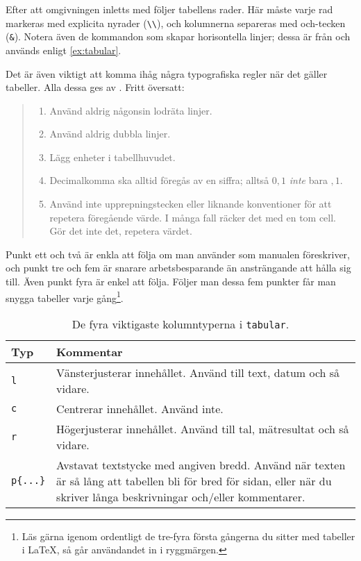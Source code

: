 \documentclass[10pt,../../a4.tex]{subfiles}
\begin{document}
Efter att omgivningen inletts med  följer tabellens rader. Här
måste varje rad markeras med explicita nyrader (\verb|\\|), och kolumnerna
separeras med och-tecken (\verb|&|). Notera även de kommandon som skapar
horisontella linjer; dessa är från  och används enligt
\cref{ex:tabular}.

Det är även viktigt att komma ihåg några typografiska regler när det
gäller tabeller. Alla dessa ges av \textcite[3]{Fear05}. Fritt
översatt:

\begin{quotation}
	\begin{enumerate}
		\item Använd aldrig någonsin lodräta linjer.
		\item Använd aldrig dubbla linjer.
		\item Lägg enheter i tabellhuvudet.
		\item Decimalkomma ska alltid föregås av en siffra; alltså \(0,1\) 
		\emph{inte} bara \(,1\).
		\item Använd inte upprepningstecken eller liknande konventioner 
		för att repetera föregående värde. I många fall räcker det med en 
		tom cell. Gör det inte det, repetera värdet.
	\end{enumerate}
\end{quotation}

Punkt ett och två är enkla att följa om man använder  som
manualen föreskriver, och punkt tre och fem är snarare arbetsbesparande än
ansträngande att hålla sig till. Även punkt fyra är enkel att följa. 
Följer man
dessa fem punkter får man snygga tabeller varje gång\footnote{Läs gärna
igenom \textcite{Fear05} ordentligt de tre-fyra första gångerna du
sitter med tabeller i \LaTeX, så går användandet in i ryggmärgen.}.

\begin{table}[tbp]
	\centering 
	\caption{De fyra viktigaste kolumntyperna i \texttt{tabular}.}
	\label{tab:kolumner}
	\begin{tabular}{l p{}}
		\toprule 
		Typ & Kommentar \\
		\midrule 
		\texttt{l} & Vänsterjusterar innehållet. Använd till text, datum
					 och så vidare. \\
		\texttt{c} & Centrerar innehållet. Använd inte. \\
		\texttt{r} & Högerjusterar innehållet. Använd till tal, 
				     mätresultat och så vidare. \\
		\texttt{p\{...\}} & Avstavat textstycke med angiven bredd. Använd
							när texten är så lång att tabellen bli för
							bred för sidan, eller när du skriver långa
							beskrivningar och/eller kommentarer. \\
		\bottomrule 
	\end{tabular}
\end{table}
\end{document}
